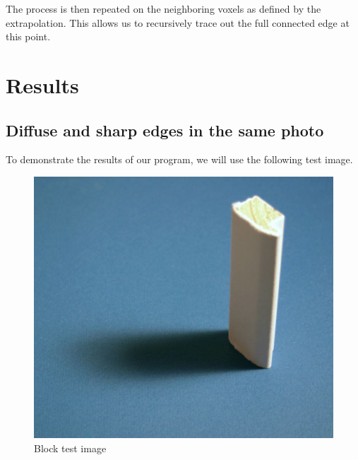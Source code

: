\documentclass{article}
\begin{document}
The process is then repeated on the neighboring voxels as defined by the extrapolation.
This allows us to recursively trace out the full connected edge at this point.







\section{Results}
\subsection{Diffuse and sharp edges in the same photo}
To demonstrate the results of our program, we will use the following test image.
\begin{figure}[H]
  \centering
  \includegraphics[scale=0.3]{Images/block/block_orig.jpg}
  \caption{Block test image}
  \label{block_orig}
\end{figure}
\end{document}

